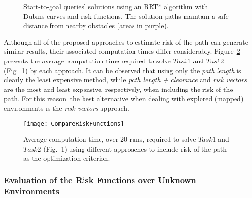 \begin{figure}[htbp]
\myfloatalign
     \quad
\caption[Start-to-goal queries' solutions using an RRT* algorithm with Dubins
curves and risk functions. The solution paths maintain a safe distance from nearby
obstacles.]
{Start-to-goal queries' solutions using an \ac{RRT*} algorithm with Dubins
curves and risk functions. The solution paths maintain a safe distance from nearby
obstacles (areas in purple).}
\label{fig:CompareRiskFunctionsTasks}
\end{figure}

Although all of the proposed approaches to estimate risk of the path can
generate similar results, their associated computation times differ
considerably. Figure~\ref{fig:CompareRiskFunctions} presents the average
computation time required to solve $Task1$ and $Task2$
(Fig.~\ref{fig:CompareRiskFunctionsTasks}) by each approach. It can be observed
that using only the \textit{path length} is clearly the least expensive method,
while \textit{path length + clearance} and \textit{risk vectors} are the most
and least expensive, respectively, when including the risk of the path. For
this reason, the best alternative when dealing with explored (mapped)
environments is the \textit{risk vectors} approach.

\begin{figure}[htbp]
	\centering
	\texttt{[image: CompareRiskFunctions]} 
\caption[Average computation time required by the planner when using different
alternatives to estimate the risk associated with a path.] 
{Average computation time, over 20 runs, required to solve $Task1$ and $Task2$
(Fig.~\ref{fig:CompareRiskFunctionsTasks}) using different approaches to include
risk of the path as the optimization criterion.}
\label{fig:CompareRiskFunctions}
\end{figure}

\subsubsection{Evaluation of the Risk Functions over Unknown Environments} 

